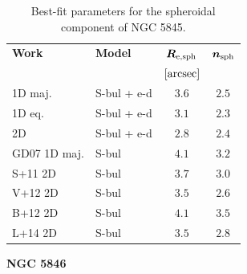\documentclass[preprint2]{emulateapj}
\begin{document}
  \begin{table}[h]
  \small
  \caption{Best-fit parameters for the spheroidal component of NGC 5845.}
  \begin{center}
  \begin{tabular}{llcc}
  \hline
  {\bf Work} & {\bf Model}   & $\bm R_{\rm e,sph}$    & $\bm n_{\rm sph}$ \\
    &  &  $[\rm arcsec]$ & \\
  \hline
  1D maj. & S-bul + e-d & $3.6$  &  $2.5$ \\
  1D eq.  & S-bul + e-d & $3.1$  &  $2.3$ \\
  2D      & S-bul + e-d & $2.8$  &  $2.4$ \\
  \hline
  GD07 1D maj.      & S-bul & $4.1$  &  $3.2$ \\
  S+11 2D      & S-bul & $3.7$  &  $3.0$ \\
  V+12 2D      & S-bul & $3.5$  &  $2.6$ \\
  B+12 2D      & S-bul & $4.1$  &  $3.5$ \\
  L+14 2D      & S-bul & $3.5$  &  $2.8$ \\
  \hline
  \end{tabular}
  \end{center}
  \label{tab:n5845}
  \end{table}



  \clearpage\newpage\noindent
  {\bf NGC 5846 \\}
\end{document}
